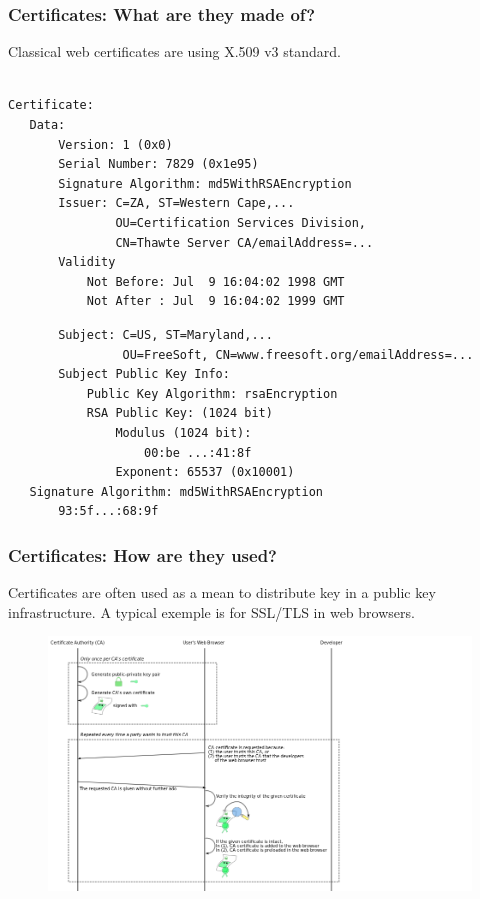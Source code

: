 \begin{frame}[fragile]
\frametitle{Certificates: What are they made of?}
Classical web certificates are using X.509 v3 standard.

\small
\begin{verbatim}

Certificate:
   Data:
       Version: 1 (0x0)
       Serial Number: 7829 (0x1e95)
       Signature Algorithm: md5WithRSAEncryption
       Issuer: C=ZA, ST=Western Cape,...
               OU=Certification Services Division,
               CN=Thawte Server CA/emailAddress=...
       Validity   
           Not Before: Jul  9 16:04:02 1998 GMT
           Not After : Jul  9 16:04:02 1999 GMT
\end{verbatim}

\end{frame}



\begin{frame}[fragile]

\small
\begin{verbatim}
       Subject: C=US, ST=Maryland,...
                OU=FreeSoft, CN=www.freesoft.org/emailAddress=...
       Subject Public Key Info:
           Public Key Algorithm: rsaEncryption
           RSA Public Key: (1024 bit)
               Modulus (1024 bit):
                   00:be ...:41:8f
               Exponent: 65537 (0x10001)
   Signature Algorithm: md5WithRSAEncryption
       93:5f...:68:9f
\end{verbatim}

\end{frame}



\begin{frame}
\frametitle{Certificates: How are they used?}
Certificates are often used as a mean to distribute key in a public
key infrastructure. A typical exemple is for SSL/TLS in web browsers.
\begin{figure}
  \includegraphics[width= 0.9\linewidth]{img/Usage-of-Digital-CertificatePart1.png}
\end{figure}

\end{frame}

